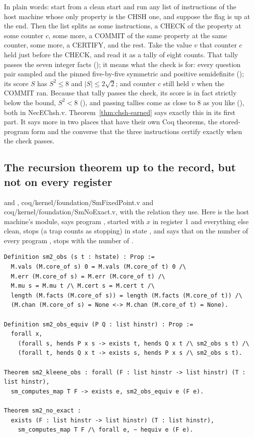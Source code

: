 In plain words: start from a clean start and run any list of instructions of the host machine whose
only property is the CHSH one, and suppose the flag is up at the end. Then the list splits as some
instructions, a CHECK of the property at some counter $c$, some more, a COMMIT of the same
property at the same counter, some more, a CERTIFY, and the rest. Take the value $v$ that
counter $c$ held just before the CHECK, and read it as a tally of eight counts. That tally
passes the seven integer facts (); it means what the check is for: every
question pair sampled and the pinned five-by-five symmetric and positive semidefinite
(); its score $S$ has $S^2 \le 8$ and $|S| \le 2\sqrt 2$; and counter
$c$ still held $v$ when the COMMIT ran. Because that tally passes the check, its score is in fact
strictly below the bound, $S^2 < 8$ (), and passing tallies come as
close to 8 as you like (), both in NecEChsh.v. Theorem~\ref{thm:chsh-earned} says exactly this in
its first part. It says more in two places that have their own Coq theorems, the stored-program form
and the converse that the three instructions certify exactly when the check passes.

\subsection{The recursion theorem up to the record, but not on every register}

{\raggedright {} and , coq/kernel/foundation/SmFixedPoint.v and coq/kernel/foundation/SmNoExact.v, with the relation they use. Here  is the host machine's module,  says program , started with $x$ in register 1 and everything else clean, stops (a trap counts as stopping) in state , and  says that on the number of every program ,  stops with the number of .\par}

{\scriptsize
\begin{verbatim}
Definition sm2_obs (s t : hstate) : Prop :=
  M.vals (M.core_of s) 0 = M.vals (M.core_of t) 0 /\
  M.err (M.core_of s) = M.err (M.core_of t) /\
  M.mu s = M.mu t /\ M.cert s = M.cert t /\
  length (M.facts (M.core_of s)) = length (M.facts (M.core_of t)) /\
  (M.chan (M.core_of s) = None <-> M.chan (M.core_of t) = None).

Definition sm2_obs_equiv (P Q : list hinstr) : Prop :=
  forall x,
    (forall s, hends P x s -> exists t, hends Q x t /\ sm2_obs s t) /\
    (forall t, hends Q x t -> exists s, hends P x s /\ sm2_obs s t).

Theorem sm2_kleene_obs : forall (F : list hinstr -> list hinstr) (T : list hinstr),
  sm_computes_map T F -> exists e, sm2_obs_equiv e (F e).

Theorem sm2_no_exact :
  exists (F : list hinstr -> list hinstr) (T : list hinstr),
    sm_computes_map T F /\ forall e, ~ hequiv e (F e).
\end{verbatim}}

